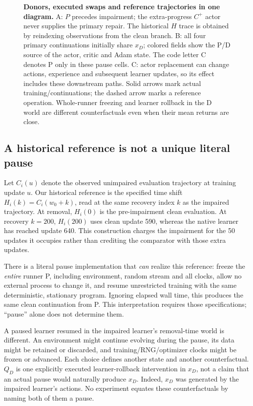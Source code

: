 \begin{figure}[p]
\centering
\resizebox{\linewidth}{!}{}
\caption{\textbf{Donors, executed swaps and reference trajectories in one diagram.} A: $P$ precedes impairment; the extra-progress $C^{+}$ actor never supplies the primary repair. The historical $H$ trace is obtained by reindexing observations from the clean branch. B: all four primary continuations initially share $x_D$; colored fields show the P/D source of the actor, critic and Adam state. The code letter C denotes P only in these pause cells. C: actor replacement can change actions, experience and subsequent learner updates, so its effect includes these downstream paths. Solid arrows mark actual training/continuations; the dashed arrow marks a reference operation. Whole-runner freezing and learner rollback in the D world are different counterfactuals even when their mean returns are close.}
\label{m:counterfactuals}
\end{figure}

\subsection{A historical reference is not a unique literal pause}\label{m:pausemeaning}
Let $C_i(u)$ denote the observed unimpaired evaluation trajectory at training update $u$. Our historical reference is the specified time shift $H_i(k)=C_i(w_0+k)$, read at the same recovery index $k$ as the impaired trajectory. At removal, $H_i(0)$ is the pre-impairment clean evaluation. At recovery $k=200$, $H_i(200)$ uses clean update 590, whereas the native learner has reached update 640. This construction charges the impairment for the 50 updates it occupies rather than crediting the comparator with those extra updates.

There is a literal pause implementation that \emph{can} realize this reference: freeze the \emph{entire} runner P, including environment, random stream and all clocks, allow no external process to change it, and resume unrestricted training with the same deterministic, stationary program. Ignoring elapsed wall time, this produces the same clean continuation from P. This interpretation requires those specifications; ``pause'' alone does not determine them.

A paused learner resumed in the impaired learner's removal-time world is different. An environment might continue evolving during the pause, its data might be retained or discarded, and training/RNG/optimizer clocks might be frozen or advanced. Each choice defines another state and another counterfactual. $Q_D$ is one explicitly executed learner-rollback intervention in $x_D$, not a claim that an actual pause would naturally produce $x_D$. Indeed, $x_D$ was generated by the impaired learner's actions. No experiment equates these counterfactuals by naming both of them a pause.

